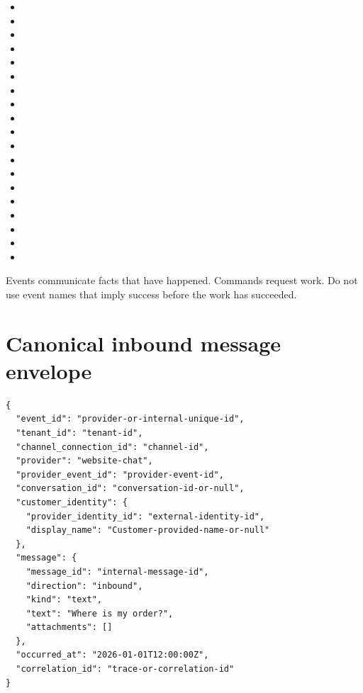 \begin{itemize}
\item {}
\item {}
\item {}
\item {}
\item {}
\item {}
\item {}
\item {}
\item {}
\item {}
\item {}
\item {}
\item {}
\item {}
\item {}
\item {}
\item {}
\item {}
\item {}
\end{itemize}
Events communicate facts that have happened. Commands request work. Do not use event names that imply success before the work has succeeded.

\section{Canonical inbound message envelope}

\begin{lstlisting}
{
  "event_id": "provider-or-internal-unique-id",
  "tenant_id": "tenant-id",
  "channel_connection_id": "channel-id",
  "provider": "website-chat",
  "provider_event_id": "provider-event-id",
  "conversation_id": "conversation-id-or-null",
  "customer_identity": {
    "provider_identity_id": "external-identity-id",
    "display_name": "Customer-provided-name-or-null"
  },
  "message": {
    "message_id": "internal-message-id",
    "direction": "inbound",
    "kind": "text",
    "text": "Where is my order?",
    "attachments": []
  },
  "occurred_at": "2026-01-01T12:00:00Z",
  "correlation_id": "trace-or-correlation-id"
}
\end{lstlisting}

